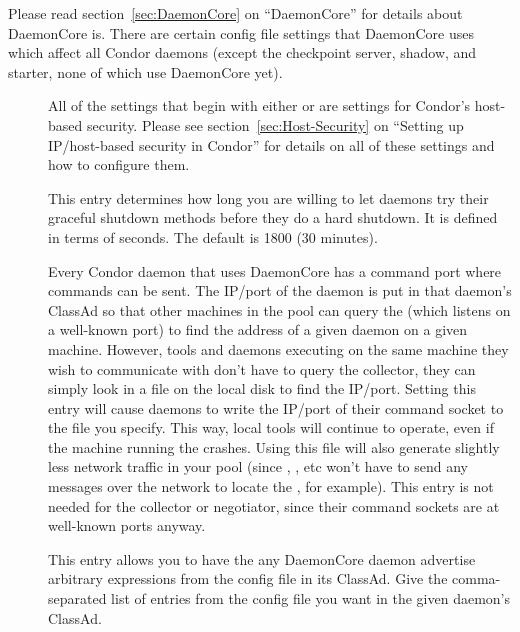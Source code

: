 Please read section~\ref{sec:DaemonCore} on ``DaemonCore'' for details
about DaemonCore is.  There are certain config file settings that
DaemonCore uses which affect all Condor daemons (except the checkpoint
server, shadow, and starter, none of which use DaemonCore yet).
\begin{description}
  
\item[] \label{param:HostAllow} All of the
  settings that begin with either  or
   are settings for Condor's host-based security.
  Please see section~\ref{sec:Host-Security} on ``Setting up
  IP/host-based security in Condor'' for details on all of these
  settings and how to configure them.

\item[]
  \label{param:ShutdownGracefulTimeout} This entry determines how long
  you are willing to let daemons try their graceful shutdown methods
  before they do a hard shutdown.  It is defined in terms of seconds.
  The default is 1800 (30 minutes).

\item[]
  \label{param:SubsysAddressFile} Every Condor daemon that uses
  DaemonCore has a command port where commands can be sent.  The
  IP/port of the daemon is put in that daemon's ClassAd so that other
  machines in the pool can query the  (which listens
  on a well-known port) to find the address of a given daemon on a
  given machine.  However, tools and daemons executing on the same
  machine they wish to communicate with don't have to query the
  collector, they can simply look in a file on the local disk to find
  the IP/port.  Setting this entry will cause daemons to write the
  IP/port of their command socket to the file you specify.  This way,
  local tools will continue to operate, even if the machine running
  the  crashes.  Using this file will also generate
  slightly less network traffic in your pool (since ,
  , etc won't have to send any messages over the network to
  locate the , for example).  This entry is not needed
  for the collector or negotiator, since their command sockets are at
  well-known ports anyway.  
  
\item[] \label{param:SubsysExprs} This entry
  allows you to have the any DaemonCore daemon advertise arbitrary
  expressions from the config file in its ClassAd.  Give the
  comma-separated list of entries from the config file you want in the
  given daemon's ClassAd.
  

\end{description}
